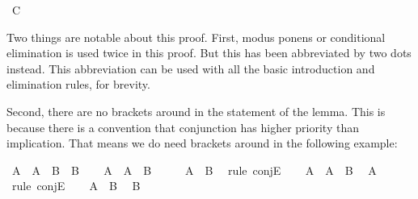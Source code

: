\begin{isabellebody}
\ {\isachardoublequoteopen}C{\isachardoublequoteclose}\isacommand{{\isachardot}{\isachardot}}\isamarkupfalse%
\isanewline
\ \ \isamarkupfalse%
\isanewline
{}\isamarkupfalse%
%
\endisatagproof
{\isafoldproof}%
%
\isadelimproof
%
\endisadelimproof
%
\begin{isamarkuptext}%
Two things are notable about this proof. First, modus ponens or conditional elimination is
used twice in this proof. But this has been abbreviated by two dots instead. This abbreviation can
be used with all the basic introduction and elimination rules, for brevity.%
\end{isamarkuptext}\isamarkuptrue%
%
\begin{isamarkuptext}%
Second, there are no brackets around  in the statement of the lemma. This is
because there is a convention that conjunction has higher priority than implication. That means we
do need brackets around  in the following example:%
\end{isamarkuptext}\isamarkuptrue%
\isamarkupfalse%
\ {\isachardoublequoteopen}A\ {\isasymand}\ {\isacharparenleft}A\ {\isasymlongrightarrow}\ B{\isacharparenright}\ {\isasymlongrightarrow}\ B{\isachardoublequoteclose}\isanewline
%
\isadelimproof
%
\endisadelimproof
%
\isatagproof
{}\isamarkupfalse%
\isanewline
\ \ \isamarkupfalse%
\ {\isachardoublequoteopen}A\ {\isasymand}\ {\isacharparenleft}A\ {\isasymlongrightarrow}\ B{\isacharparenright}{\isachardoublequoteclose}\isanewline
\ \ \isamarkupfalse%
\ \isamarkupfalse%
\ {\isachardoublequoteopen}A\ {\isasymlongrightarrow}\ B{\isachardoublequoteclose}\ \isamarkupfalse%
\ {\isacharparenleft}rule\ conjE{\isacharparenright}\isanewline
\ \ \isamarkupfalse%
\ {\isacharbackquoteopen}A\ {\isasymand}\ {\isacharparenleft}A\ {\isasymlongrightarrow}\ B{\isacharparenright}{\isacharbackquoteclose}\ \isamarkupfalse%
\ {\isachardoublequoteopen}A{\isachardoublequoteclose}\ \isamarkupfalse%
\ {\isacharparenleft}rule\ conjE{\isacharparenright}\isanewline
\ \ \isamarkupfalse%
\ {\isacharbackquoteopen}A\ {\isasymlongrightarrow}\ B{\isacharbackquoteclose}\ \isamarkupfalse%
\ {\isachardoublequoteopen}B{\isachardoublequoteclose}\isacommand{{\isachardot}{\isachardot}}\isamarkupfalse%
\isanewline
{}\isamarkupfalse%
%
\endisatagproof
{\isafoldproof}%
%
\isadelimproof
%
\endisadelimproof

\end{isabellebody}
